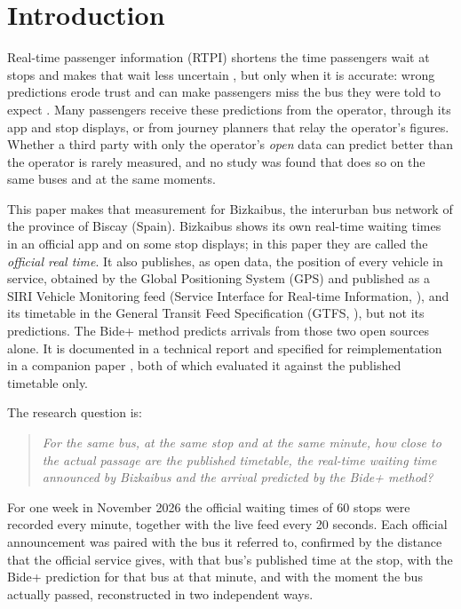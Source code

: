 \section{Introduction}
\label{sec:intro}

Real-time passenger information (RTPI) shortens the time passengers wait at stops and makes that wait less uncertain
\parencite{watkins2011,dziekan2007dynamic,brakewood2019}, but only when it is accurate: wrong predictions erode trust and
can make passengers miss the bus they were told to expect \parencite{gooze2013benefits,rahman2013users}. Many passengers
receive these predictions from the operator, through its app and stop displays, or from journey planners that relay the
operator's figures. Whether a third party with only the operator's \emph{open} data can predict better than the operator
is rarely measured, and no study was found that does so on the same buses and at the same moments.

This paper makes that measurement for Bizkaibus, the interurban bus network of the province of Biscay (Spain). Bizkaibus
shows its own real-time waiting times in an official app and on some stop displays; in this paper they are called the
\emph{official real time}. It also publishes,
as open data, the position of every vehicle in service, obtained by the Global Positioning System (GPS) and published as
a SIRI Vehicle Monitoring feed (Service Interface for Real-time Information, \cite{siri}), and its timetable in the
General Transit Feed Specification (GTFS, \cite{gtfs}), but not its predictions. The Bide+ method predicts arrivals from
those two open sources alone. It is documented in a technical report \parencite{garrido2026memoria} and specified for
reimplementation in a companion paper \parencite{garrido2026metodo}, both of which evaluated it against the published
timetable only.

The research question is:

\begin{quote}
\emph{For the same bus, at the same stop and at the same minute, how close to the actual passage are the published
timetable, the real-time waiting time announced by Bizkaibus and the arrival predicted by the Bide+ method?}
\end{quote}

For one week in November 2026 the official waiting times of 60 stops were recorded every minute, together with the live
feed every 20 seconds. Each official announcement was paired with the bus it referred to, confirmed by the distance that
the official service gives, with that bus's published time at the stop, with the Bide+ prediction for that bus at that
minute, and with the moment the bus actually passed, reconstructed in two independent ways.

